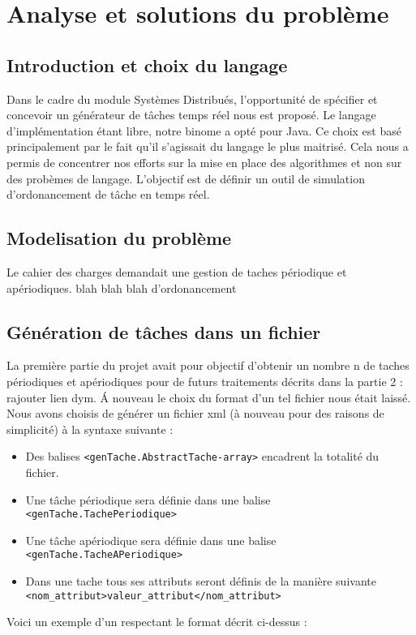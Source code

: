 \chapter{Analyse et solutions du problème}
\section{Introduction et choix du langage}
Dans le cadre du module Systèmes Distribués, l'opportunité de  spécifier et concevoir  un générateur de tâches temps réel nous est proposé. Le langage d'implémentation étant libre, notre binome a opté pour Java. Ce choix est basé principalement par le fait qu'il s'agissait du langage le plus maitrisé. Cela nous a permis de concentrer nos efforts sur la mise en place des algorithmes et non sur des probèmes de langage.
 L'objectif est de définir un outil de simulation  d'ordonancement de tâche en temps réel.

\section{Modelisation du problème}
Le cahier des charges demandait une gestion de taches périodique et apériodiques. blah blah blah d'ordonancement
\section{Génération de tâches dans un fichier}
La première partie du projet avait pour objectif d'obtenir un nombre n de taches périodiques et apériodiques pour de futurs traitements décrits dans la partie 2 : rajouter lien dym. \'A nouveau le choix du format d'un tel fichier nous était laissé. Nous avons choisis de générer un fichier xml (à nouveau pour des raisons  de simplicité) à la syntaxe suivante : 

\begin{itemize}
\item
Des balises \verb+<genTache.AbstractTache-array>+ encadrent la totalité du fichier.
\item
Une tâche périodique sera définie dans une balise  \verb+<genTache.TachePeriodique>+ 
\item
Une tâche apériodique sera définie dans une balise  \verb+<genTache.TacheAPeriodique>+ 
\item
Dans une tache tous ses attributs seront définis de la manière suivante \verb+<nom_attribut>valeur_attribut</nom_attribut>+
\end{itemize}

Voici un exemple d'un respectant le format décrit ci-dessus : 

